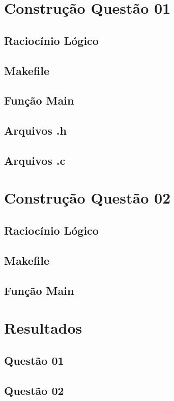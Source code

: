 \documentclass[11pt]{article}
\begin{document}
\section{Constru\c{c}\~ao Quest\~ao 01}
	\subsection{Racioc\'inio L\'ogico}
	\subsection{Makefile}
	\subsection{Fun\c{c}\~ao Main}
	\subsection{Arquivos .h}
	\subsection{Arquivos .c}
\section{Constru\c{c}\~ao Quest\~ao 02}
	\subsection{Racioc\'inio L\'ogico}
	\subsection{Makefile}
	\subsection{Fun\c{c}\~ao Main}
\section{Resultados}
	\subsection{Quest\~ao 01}
	\subsection{Quest\~ao 02}
\end{document}
